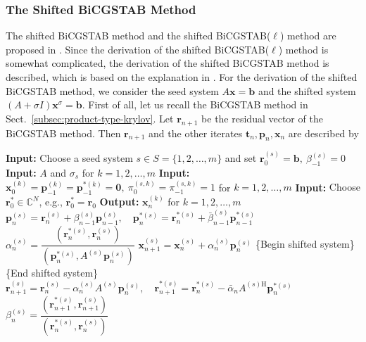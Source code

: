 \subsubsection{{The Shifted BiCGSTAB Method}}\label{subsec:shifted-bicgstab}
{The shifted BiCGSTAB method and the shifted BiCGSTAB($\ell$) method are proposed in . Since the derivation of the shifted BiCGSTAB($\ell$) method is somewhat complicated, the derivation of the shifted BiCGSTAB method is described, which is based on the explanation in . For the derivation of the shifted BiCGSTAB method, we consider the seed system $A\bm x=\bm b$ and the shifted system $(A+\sigma I)\bm x^{\sigma}=\bm b$. First of all, let us recall the BiCGSTAB method in Sect.\ \ref{subsec:product-type-krylov}. Let $\bm r_{n+1}$ be the residual vector of the BiCGSTAB method. Then $\bm r_{n+1}$ and the other iterates $\bm t_n,\bm p_n,\bm x_n$ are described by}
\begin{algorithm}[H]\caption{{The shifted BiCG method}}\label{alg:shifted-bicg}\begin{algorithmic}[1]
\Statex\textbf{Input:} {Choose a seed system $s\in S=\{1,2,\ldots,m\}$ and set $\bm r_0^{(s)}=\bm b,\ \beta_{-1}^{(s)}=0$}
\Statex\textbf{Input:} $A$ {and} $\sigma_s$ {for} $k=1,2,\ldots,m$
\Statex\textbf{Input:} $\bm x_0^{(k)}=\bm p_{-1}^{(k)}=\bm p_{-1}^{*(k)}=\bm0,\ \pi_0^{(s,k)}=\pi_{-1}^{(s,k)}=1$ {for} $k=1,2,\ldots,m$
\Statex\textbf{Input:} {Choose $\bm r_0^*\in\mathbb C^N$, e.g., $\bm r_0^*=\bm r_0$}
\Statex\textbf{Output:} $\bm x_n^{(k)}$ {for} $k=1,2,\ldots,m$
\State $\bm p_n^{(s)}=\bm r_n^{(s)}+\beta_{n-1}^{(s)}\bm p_{n-1}^{(s)},\quad\bm p_n^{*(s)}=\bm r_n^{*(s)}+\bar\beta_{n-1}^{(s)}\bm p_{n-1}^{*(s)}$
\State $\alpha_n^{(s)}=\dfrac{(\bm r_n^{*(s)},\bm r_n^{(s)})}{(\bm p_n^{*(s)},A^{(s)}\bm p_n^{(s)})}$
\State $\bm x_{n+1}^{(s)}=\bm x_n^{(s)}+\alpha_n^{(s)}\bm p_n^{(s)}$
\State \{{Begin shifted system}\}
\State \{{End shifted system}\}
\State $\bm r_{n+1}^{(s)}=\bm r_n^{(s)}-\alpha_n^{(s)}A^{(s)}\bm p_n^{(s)},\quad\bm r_{n+1}^{*(s)}=\bm r_n^{*(s)}-\bar\alpha_nA^{(s)\mathrm H}\bm p_n^{*(s)}$
\State $\beta_n^{(s)}=\dfrac{(\bm r_{n+1}^{*(s)},\bm r_{n+1}^{(s)})}{(\bm r_n^{*(s)},\bm r_n^{(s)})}$
\EndFor\end{algorithmic}\end{algorithm}
